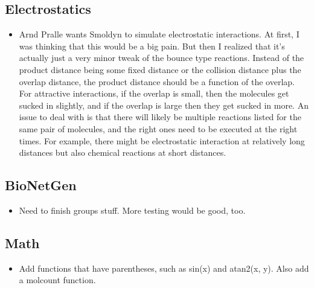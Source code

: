 \documentclass {scrbook}
\begin{document}
\subsection{Electrostatics}
\begin{itemize}
\item Arnd Pralle wants Smoldyn to simulate electrostatic interactions. At first, I was thinking that this would be a big pain. But then I realized that it's actually just a very minor tweak of the bounce type reactions. Instead of the product distance being some fixed distance or the collision distance plus the overlap distance, the product distance should be a function of the overlap. For attractive interactions, if the overlap is small, then the molecules get sucked in slightly, and if the overlap is large then they get sucked in more. An issue to deal with is that there will likely be multiple reactions listed for the same pair of molecules, and the right ones need to be executed at the right times. For example, there might be electrostatic interaction at relatively long distances but also chemical reactions at short distances.
\end{itemize}

\subsection{BioNetGen}
\begin{itemize}
\item Need to finish groups stuff. More testing would be good, too.
\end{itemize}

\subsection{Math}
\begin{itemize}
\item Add functions that have parentheses, such as sin(x) and atan2(x, y). Also add a molcount function.
\end{itemize}
\end{document}
